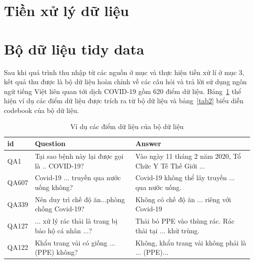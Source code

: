 \documentclass[runningheads]{llncs}
\begin{document}
\section{Tiền xử lý dữ liệu}

\section{Bộ dữ liệu tidy data}
Sau khi quá trình thu nhập từ các nguồn ở mục và thực hiện tiền xử lí ở mục 3, kết quả thu được là bộ dữ liệu hoàn chỉnh về các câu hỏi và trả lời sử dụng ngôn ngữ tiếng Việt liên quan tới dịch COVID-19 gồm 620 điểm dữ liệu. Bảng~\ref{tab1} thể hiện ví dụ các điểm dữ liệu được trích ra từ bộ dữ liệu và bảng~\ref{tab2} biểu diễn codebook của bộ dữ liệu.

\begin{longtable} 	{|p{1cm}|p{}|p{}|}
	\caption{Ví dụ các điểm dữ liệu của bộ dữ liệu }\label{tab1}\\
	\hline
	id & Question & Answer\\
	\hline
	QA1&
	Tại sao bệnh này lại được gọi là .. COVID-19?
	&Vào ngày 11 tháng 2 năm 2020, Tổ Chức Y Tế Thế Giới ... \\
	\hline
	
	QA607&Covid-19 ... truyền qua nước uống không?&Covid-19 không thể lây truyền ... qua nước uống.\\
	\hline

	QA339&Nên duy trì chế độ ăn...phòng chống Covid-19?&Không có chế độ ăn ... riêng với Covid-19  \\
	\hline
	QA127&... xử lý rác thải là trang bị bảo hộ cá nhân ...?&Thải bỏ PPE vào thùng rác. Rác thải tại  ... khử trùng.\\
	\hline
	QA122&Khẩu trang vải có giống ... (PPE) không?&Không, khẩu trang vải không phải là ... (PPE)...\\
	
	
	\hline

\end{longtable}
\end{document}
